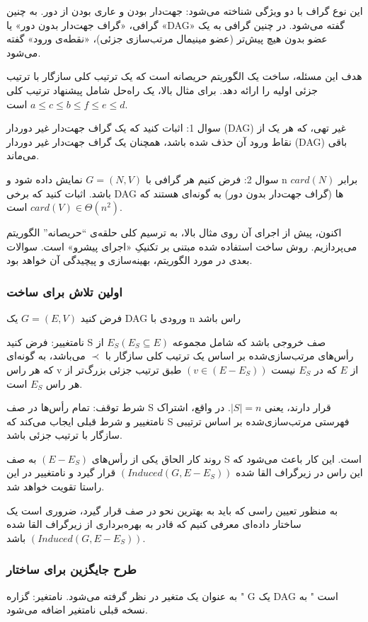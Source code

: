 \documentclass{book} %
\begin{document}
این نوع گراف با دو ویژگی شناخته می‌شود: جهت‌دار بودن و عاری بودن از دور. به چنین گرافی، «گراف جهت‌دار بدون دور» یا «DAG» گفته می‌شود. در چنین
گرافی به یک عضو بدون هیچ پیش‌تر  (عضو مینیمال مرتب‌سازی جزئی)، «نقطه‌ی ورود»
گفته می‌شود.

هدف این مسئله، ساخت یک الگوریتم حریصانه است که یک ترتیب کلی سازگار با ترتیب جزئی اولیه را ارائه دهد. برای مثال بالا، یک راه‌حل شامل پیشنهاد ترتیب کلی $a \le c \le b \le f \le e \le d$ است.

سوال 1: اثبات کنید که یک گراف جهت‌دار غیر دوردار (DAG) غیر تهی، که هر یک از نقاط ورود آن حذف
شده باشد، همچنان یک گراف جهت‌دار غیر دوردار (DAG) باقی می‌ماند.


سوال 2: فرض کنیم هر گرافی با $G = (N, V)$ نمایش داده شود و n برابر $card(N)$ باشد.
اثبات کنید که برخی DAG ها (گراف جهت‌دار بدون دور) به گونه‌ای هستند که $card(V) \in \Theta (n^2)$
است.

اکنون، پیش از اجرای آن روی مثال بالا، به ترسیم کلی حلقه‌ی “حریصانه” الگوریتم می‌پردازیم.
روش ساخت استفاده شده مبتنی بر تکنیکِ «اجرای پیشرو» است. سوالات بعدی در مورد
الگوریتم، بهینه‌سازی و پیچیدگی آن خواهد بود.

\newpage

\subsubsection*{اولین تلاش برای ساخت}
فرض کنید $G = (E, V)$ یک DAG ورودی با n راس باشد

نامتغییر: فرض کنید S صف خروجی باشد که شامل مجموعه $E_{S} (E_{S} \subseteq E)$ از رأس‌های مرتب‌سازی‌شده بر اساس یک ترتیب کلی سازگار با $\prec$ می‌باشد، به گونه‌ای که هر راس v از $E$ که در $E_{S}$ نیست $(v \in (E - E_{S} ))$ طبق ترتیب جزئی بزرگ‌تر از هر راس $E_{S}$ است.

شرط توقف: تمام رأس‌ها در صف S قرار دارند، یعنی $|S| = n$.
در واقع، اشتراک نامتغییر و شرط قبلی ایجاب می‌کند که S
فهرستی مرتب‌سازی‌شده بر اساس ترتیبی سازگار با ترتیب جزئی باشد.

روند کار الحاق یکی از رأس‌های $(E - E_{S} )$ به صف S است.
این کار باعث می‌شود که این راس در زیرگراف القا شده $(Induced(G, E - E_{S} ))$ قرار گیرد
و نامتغییر در این راستا تقویت خواهد شد.

به منظور تعیین راسی که باید به بهترین نحو در صف قرار گیرد، ضروری است یک ساختار
داده‌ای معرفی کنیم که قادر به بهره‌برداری از زیرگراف القا شده $(Induced(G, E - E_{S} ))$ باشد.

\subsubsection*{طرح جایگزین برای ساختار}
به عنوان یک متغیر در نظر گرفته می‌شود.
نامتغیر: گزاره " G یک DAG است " به نسخه قبلی نامتغیر اضافه می‌شود.
\end{document}
